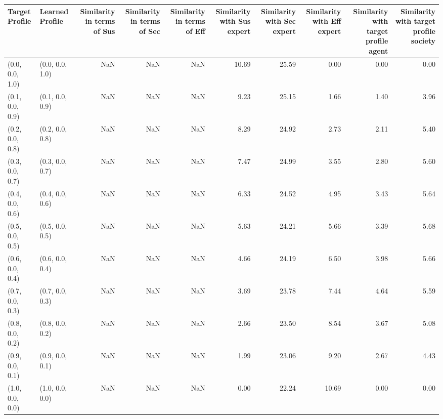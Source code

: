 \begin{tabular}{llrrrrrrrr}
\toprule
Target Profile & Learned Profile & Similarity in terms of Sus & Similarity in terms of Sec & Similarity in terms of Eff & Similarity with Sus expert & Similarity with Sec expert & Similarity with Eff expert & Similarity with target profile agent & Similarity with target profile society \\
\midrule
(0.0, 0.0, 1.0) & (0.0, 0.0, 1.0) & NaN & NaN & NaN & 10.69 & 25.59 & 0.00 & 0.00 & 0.00 \\
(0.1, 0.0, 0.9) & (0.1, 0.0, 0.9) & NaN & NaN & NaN & 9.23 & 25.15 & 1.66 & 1.40 & 3.96 \\
(0.2, 0.0, 0.8) & (0.2, 0.0, 0.8) & NaN & NaN & NaN & 8.29 & 24.92 & 2.73 & 2.11 & 5.40 \\
(0.3, 0.0, 0.7) & (0.3, 0.0, 0.7) & NaN & NaN & NaN & 7.47 & 24.99 & 3.55 & 2.80 & 5.60 \\
(0.4, 0.0, 0.6) & (0.4, 0.0, 0.6) & NaN & NaN & NaN & 6.33 & 24.52 & 4.95 & 3.43 & 5.64 \\
(0.5, 0.0, 0.5) & (0.5, 0.0, 0.5) & NaN & NaN & NaN & 5.63 & 24.21 & 5.66 & 3.39 & 5.68 \\
(0.6, 0.0, 0.4) & (0.6, 0.0, 0.4) & NaN & NaN & NaN & 4.66 & 24.19 & 6.50 & 3.98 & 5.66 \\
(0.7, 0.0, 0.3) & (0.7, 0.0, 0.3) & NaN & NaN & NaN & 3.69 & 23.78 & 7.44 & 4.64 & 5.59 \\
(0.8, 0.0, 0.2) & (0.8, 0.0, 0.2) & NaN & NaN & NaN & 2.66 & 23.50 & 8.54 & 3.67 & 5.08 \\
(0.9, 0.0, 0.1) & (0.9, 0.0, 0.1) & NaN & NaN & NaN & 1.99 & 23.06 & 9.20 & 2.67 & 4.43 \\
(1.0, 0.0, 0.0) & (1.0, 0.0, 0.0) & NaN & NaN & NaN & 0.00 & 22.24 & 10.69 & 0.00 & 0.00 \\
\bottomrule
\end{tabular}
